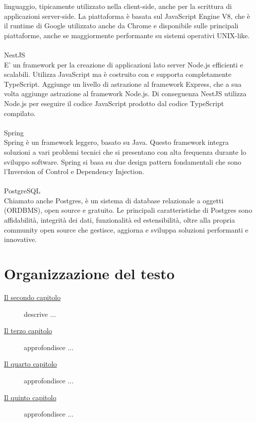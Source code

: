 linguaggio, tipicamente utilizzato nella client-side, anche per la scrittura di applicazioni server-side.
La piattaforma è basata sul JavaScript Engine V8, che è il runtime di Google utilizzato anche da Chrome e 
disponibile sulle principali piattaforme, anche se maggiormente performante su sistemi operativi UNIX-like.
\\\\
NestJS
\\
E' un framework per la creazione di applicazioni lato server Node.js efficienti e scalabili. 
Utilizza JavaScript ma è costruito con e supporta completamente TypeScript. Aggiunge un livello di astrazione
al framework Express, che a sua volta aggiunge astrazione al framework Node.js. Di conseguenza NestJS 
utilizza Node.js per eseguire il codice JavaScript prodotto dal codice TypeScript compilato.
\\\\
Spring
\\
Spring è un framework leggero, basato su Java. Questo framework integra soluzioni a vari problemi tecnici
che si presentano con alta frequenza durante lo sviluppo software. Spring si basa su due design pattern
fondamentali che sono l'Inversion of Control e Dependency Injection.
\\\\
PostgreSQL
\\
Chiamato anche Postgres, è un sistema di database relazionale a oggetti (ORDBMS), open source e 
gratuito.
Le principali caratteristiche di Postgres sono affidabilità, integrità dei dati, funzionalità ed estensibilità, 
oltre alla propria community open source che gestisce, aggiorna e sviluppa soluzioni performanti e innovative.

\section{Organizzazione del testo}

\begin{description}
    \item[{\hyperref[cap:analisi-requisiti]{Il secondo capitolo}}] descrive ...
    
    \item[{\hyperref[cap:progettazione]{Il terzo capitolo}}] approfondisce ...
    
    \item[{\hyperref[cap:realizzazione-e-testing]{Il quarto capitolo}}] approfondisce ...
    
    \item[{\hyperref[cap:conclusioni]{Il quinto capitolo}}] approfondisce ...
\end{description}

